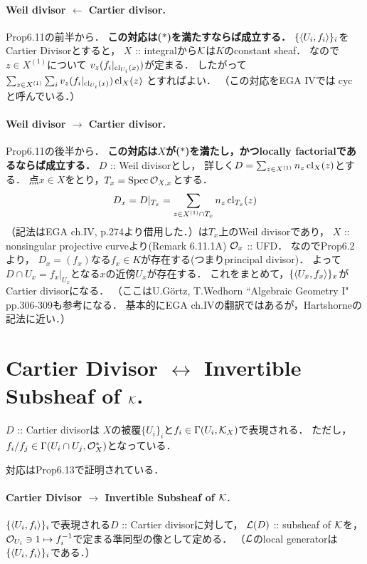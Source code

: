 \documentclass[a4paper]{jsarticle}
\begin{document}
    \paragraph{Weil divisor $\leftarrow$ Cartier divisor.}
    Prop6.11の前半から．
    \textbf{この対応は($*$)を満たすならば成立する．}
    $\{\langle U_i,f_i \rangle\}_i$をCartier Divisorとすると，
    $X$ :: integralから$\mathcal{K}$は$K$のconstant sheaf．
    なので$z \in X^{(1)}$について
    $v_z(f_i|_{\operatorname{cl}_{U_i}(x)})$が定まる．
    したがって
    $\sum_{z \in X^{(1)}} \sum_{i} v_z(f_i|_{\operatorname{cl}_{U_i}(x)}) \operatorname{cl}_X(z)$
    とすればよい．
    （この対応をEGA IVでは$\operatorname{cyc}$と呼んでいる．）

    \paragraph{Weil divisor $\rightarrow$ Cartier divisor.}
    Prop6.11の後半から．
    \textbf{この対応は$X$が($*$)を満たし，かつlocally factorialであるならば成立する．}
    $D$ :: Weil divisorとし，
    詳しく$D=\sum_{z \in X^{(1)}} n_z \operatorname{cl}_X(z)$とする．
    点$x \in X$をとり，$T_x=\operatorname{Spec} \mathcal{O}_{X,x}$とする．
    \[ D_x=D|_{T_x}=\sum_{z \in X^{(1)} \cap T_x} n_z \operatorname{cl}_{T_x}(z) \]
    （記法はEGA ch.IV, p.274より借用した．）は$T_x$上のWeil divisorであり，
    $X$ :: nonsingular projective curveより(Remark 6.11.1A) $\mathcal{O}_x$ :: UFD．
    なのでProp6.2より，
    $D_x=(f_x)$なる$f_x \in K$が存在する(つまりprincipal divisor)．
    よって$D \cap U_x=f_x|_{U_x}$となる$x$の近傍$U_x$が存在する．
    これをまとめて，$\{\langle U_x,f_x \rangle\}_x$がCartier divisorになる．
    （ここはU.G\"ortz, T.Wedhorn ``Algebraic Geometry I" pp.306-309も参考になる．
    基本的にEGA ch.IVの翻訳ではあるが，Hartshorneの記法に近い．）

\section{Cartier Divisor $\leftrightarrow$ Invertible Subsheaf of $\mathcal{K}$.}
    $D$ :: Cartier divisorは
    $X$の被覆$\{U_i\}_i$と$f_i \in \Gamma(U_i, \mathcal{K}_X)$で表現される．
    ただし，$f_i/f_j \in \Gamma(U_i \cap U_j, \mathcal{O}_X^*)$となっている．

    対応はProp6.13で証明されている．
\paragraph{Cartier Divisor $\rightarrow$ Invertible Subsheaf of $\mathcal{K}$.}
    $\{\langle U_i,f_i \rangle\}_i$で表現される$D$ :: Cartier divisorに対して，
    $\mathcal{L}(D)$ :: subsheaf of $\mathcal{K}$を，
    $\mathcal{O}_{U_i} \ni 1 \mapsto f_i^{-1}$で定まる準同型の像として定める．
    （$\mathcal{L}$のlocal generatorは$\{\langle U_i,f_i \rangle\}_i$である．）
\end{document}
